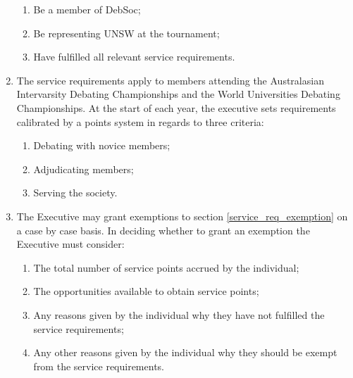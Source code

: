 \begin{enumerate}
  \begin{enumerate}
  \item Be a member of DebSoc;
  \item Be representing UNSW at the tournament;
  \item Have fulfilled all relevant service requirements. \label{service_req_exemption}
  \end{enumerate}
\item The service requirements apply to members attending the Australasian Intervarsity Debating Championships and the World Universities Debating Championships. At the start of each year, the executive sets requirements calibrated by a points system in regards to three criteria:
  \begin{enumerate}
  \item Debating with novice members;
  \item Adjudicating members;
  \item Serving the society.
  \end{enumerate}
\item The Executive may grant exemptions to section \ref{service_req_exemption} on a case by case basis. In deciding whether to grant an exemption the Executive must consider:
  \begin{enumerate}
  \item The total number of service points accrued by the individual;
  \item The opportunities available to obtain service points;
  \item Any reasons given by the individual why they have not fulfilled the service requirements;
  \item Any other reasons given by the individual why they should be exempt from the service requirements.
  \end{enumerate}
\end{enumerate}
